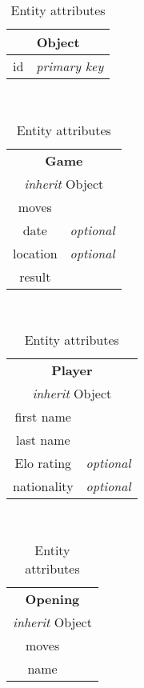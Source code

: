 \documentclass{article}
\begin{document}
\begin{table}[ht!]
    \caption{Entity attributes}
    \label{attr}
    
    \begin{subtable}{3.5cm}
	\begin{tabular}[t]{|cr|}
	\hline
	\multicolumn{2}{|c|}{\textbf{Object}} \\
	\hline 
	id & \emph{primary key} \\
	\hline
	\end{tabular}
    \end{subtable}
    ~
    \begin{subtable}{3.5cm}
	\begin{tabular}[t]{|cr|}
	\hline
	\multicolumn{2}{|c|}{\textbf{Game}} \\
	\multicolumn{2}{|c|}{\emph{inherit} Object} \\
	\hline 
	moves    &                  \\
	date     & \emph{optional}    \\
	location & \emph{optional}    \\
	result   &                  \\
	\hline
	\end{tabular}
    \end{subtable}
    ~
    \begin{subtable}{3.5cm}
	\begin{tabular}[t]{|cr|}
	\hline
	\multicolumn{2}{|c|}{\textbf{Player}} \\
	\multicolumn{2}{|c|}{\emph{inherit} Object} \\
	\hline 
	first name   &                  \\
	last name    &                  \\
	Elo rating   & \emph{optional}    \\
	nationality  & \emph{optional}    \\
	\hline
	\end{tabular}
    \end{subtable}
    ~
    \begin{subtable}{3.5cm}
	\begin{tabular}[t]{|cr|}
	\hline
	\multicolumn{2}{|c|}{\textbf{Opening}} \\
	\multicolumn{2}{|c|}{\emph{inherit} Object} \\
	\hline
	moves  &                  \\
	name   &                  \\
	\hline
	\end{tabular}

\end{subtable}
\end{table}
\end{document}
